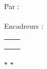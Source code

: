 \begin{titlepage}
	\parbox{\textwidth}{
	\begin{center}
	\large{Par :}  \\
	\vspace{0.3 cm}
	\large{\@author} \\
	\vspace*{1 cm}
	\large{Encadreurs :}\\
	\vspace{0.3 cm}
	\begin{tabular}{ll}
		\normalsize \@encadreura \\
		\normalsize \@encadreurb \\
		\normalsize \@encadreurc \\
	\end{tabular}
	\end{center}
	}
	
	\parbox{\textwidth}{
	\begin{center}
	$\star$
	\centering\textit{\@anneeUniversitaire} $\star$ \\
	\end{center}
	}
\end{titlepage}


\restoregeometry  
  
\makeatother